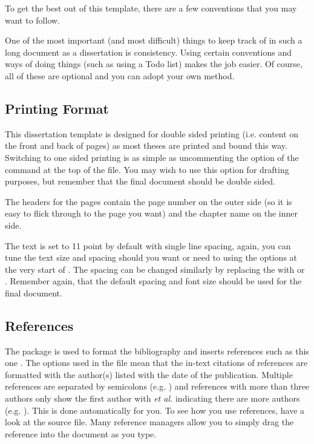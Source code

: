 To get the best out of this template, there are a few conventions that you may want to follow.

One of the most important (and most difficult) things to keep track of in such a long document as a dissertation is consistency. Using certain conventions and ways of doing things (such as using a Todo list) makes the job easier. Of course, all of these are optional and you can adopt your own method.

\subsection{Printing Format}

This dissertation template is designed for double sided printing (i.e. content on the front and back of pages) as most theses are printed and bound this way. Switching to one sided printing is as simple as uncommenting the  option of the  command at the top of the  file. You may wish to use this option for drafting purposes, but remember that the final document should be double sided.

The headers for the pages contain the page number on the outer side (so it is easy to flick through to the page you want) and the chapter name on the inner side.

The text is set to 11 point by default with single line spacing, again, you can tune the text size and spacing should you want or need to using the options at the very start of . The spacing can be changed similarly by replacing the  with  or . Remember again, that the default spacing and font size should be used for the final document.

\subsection{References}

The  package is used to format the bibliography and inserts references such as this one \parencite{Reference1}. The options used in the  file mean that the in-text citations of references are formatted with the author(s) listed with the date of the publication. Multiple references are separated by semicolons (e.g. \parencite{Reference2, Reference1}) and references with more than three authors only show the first author with \emph{et al.} indicating there are more authors (e.g. \parencite{Reference3}). This is done automatically for you. To see how you use references, have a look at the  source file. Many reference managers allow you to simply drag the reference into the document as you type.

